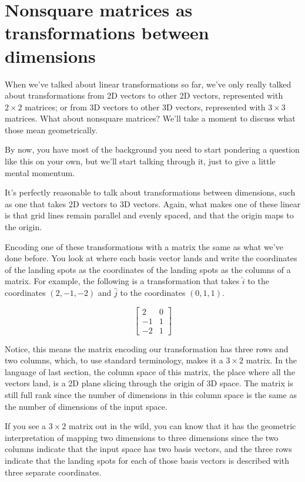 \section{Nonsquare matrices as transformations between dimensions}

When we've talked about linear transformations so far, we've only really talked
about transformations from 2D vectors to other 2D vectors, represented with
$2 \times 2$ matrices; or from 3D vectors to other 3D vectors, represented with
$3 \times 3$ matrices. What about nonsquare matrices? We'll take a moment to
discuss what those mean geometrically.

By now, you have most of the background you need to start pondering a question
like this on your own, but we'll start talking through it, just to give a little
mental momentum.

It's perfectly reasonable to talk about transformations between dimensions, such
as one that takes 2D vectors to 3D vectors. Again, what makes one of these
linear is that grid lines remain parallel and evenly spaced, and that the origin
maps to the origin.

Encoding one of these transformations with a matrix the same as what we've done
before. You look at where each basis vector lands and write the coordinates of
the landing spots as the coordinates of the landing spots as the columns of a
matrix. For example, the following is a transformation that takes $\hat{i}$ to
the coordinates $(2, -1, -2)$ and $\hat{j}$ to the coordinates $(0, 1, 1)$.

\begin{equation*}
  \begin{bmatrix}
    2 & 0 \\
    -1 & 1 \\
    -2 & 1
  \end{bmatrix}
\end{equation*}

Notice, this means the matrix encoding our transformation has three rows and two
columns, which, to use standard terminology, makes it a $3 \times 2$ matrix. In
the language of last section, the column space of this matrix, the place where
all the vectors land, is a 2D plane slicing through the origin of 3D space. The
matrix is still full rank since the number of dimensions in this column space is
the same as the number of dimensions of the input space.

If you see a $3 \times 2$ matrix out in the wild, you can know that it has the
geometric interpretation of mapping two dimensions to three dimensions since the
two columns indicate that the input space has two basis vectors, and the three
rows indicate that the landing spots for each of those basis vectors is
described with three separate coordinates.

